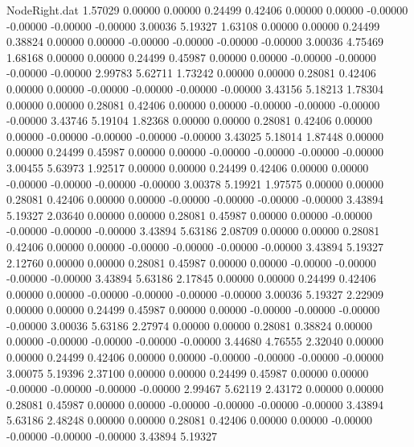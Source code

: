 \begin{filecontents}{NodeRight.dat}
   1.57029    0.00000    0.00000     0.24499    0.42406    0.00000    0.00000   -0.00000   -0.00000   -0.00000   -0.00000    3.00036    5.19327
   1.63108    0.00000    0.00000     0.24499    0.38824    0.00000    0.00000   -0.00000   -0.00000   -0.00000   -0.00000    3.00036    4.75469
   1.68168    0.00000    0.00000     0.24499    0.45987    0.00000    0.00000   -0.00000   -0.00000   -0.00000   -0.00000    2.99783    5.62711
   1.73242    0.00000    0.00000     0.28081    0.42406    0.00000    0.00000   -0.00000   -0.00000   -0.00000   -0.00000    3.43156    5.18213
   1.78304    0.00000    0.00000     0.28081    0.42406    0.00000    0.00000   -0.00000   -0.00000   -0.00000   -0.00000    3.43746    5.19104
   1.82368    0.00000    0.00000     0.28081    0.42406    0.00000    0.00000   -0.00000   -0.00000   -0.00000   -0.00000    3.43025    5.18014
   1.87448    0.00000    0.00000     0.24499    0.45987    0.00000    0.00000   -0.00000   -0.00000   -0.00000   -0.00000    3.00455    5.63973
   1.92517    0.00000    0.00000     0.24499    0.42406    0.00000    0.00000   -0.00000   -0.00000   -0.00000   -0.00000    3.00378    5.19921
   1.97575    0.00000    0.00000     0.28081    0.42406    0.00000    0.00000   -0.00000   -0.00000   -0.00000   -0.00000    3.43894    5.19327
   2.03640    0.00000    0.00000     0.28081    0.45987    0.00000    0.00000   -0.00000   -0.00000   -0.00000   -0.00000    3.43894    5.63186
   2.08709    0.00000    0.00000     0.28081    0.42406    0.00000    0.00000   -0.00000   -0.00000   -0.00000   -0.00000    3.43894    5.19327
   2.12760    0.00000    0.00000     0.28081    0.45987    0.00000    0.00000   -0.00000   -0.00000   -0.00000   -0.00000    3.43894    5.63186
   2.17845    0.00000    0.00000     0.24499    0.42406    0.00000    0.00000   -0.00000   -0.00000   -0.00000   -0.00000    3.00036    5.19327
   2.22909    0.00000    0.00000     0.24499    0.45987    0.00000    0.00000   -0.00000   -0.00000   -0.00000   -0.00000    3.00036    5.63186
   2.27974    0.00000    0.00000     0.28081    0.38824    0.00000    0.00000   -0.00000   -0.00000   -0.00000   -0.00000    3.44680    4.76555
   2.32040    0.00000    0.00000     0.24499    0.42406    0.00000    0.00000   -0.00000   -0.00000   -0.00000   -0.00000    3.00075    5.19396
   2.37100    0.00000    0.00000     0.24499    0.45987    0.00000    0.00000   -0.00000   -0.00000   -0.00000   -0.00000    2.99467    5.62119
   2.43172    0.00000    0.00000     0.28081    0.45987    0.00000    0.00000   -0.00000   -0.00000   -0.00000   -0.00000    3.43894    5.63186
   2.48248    0.00000    0.00000     0.28081    0.42406    0.00000    0.00000   -0.00000   -0.00000   -0.00000   -0.00000    3.43894    5.19327

\end{filecontents}
